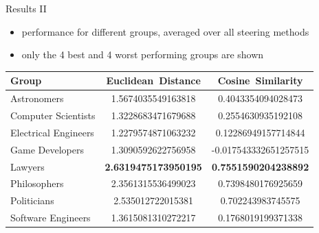 \documentclass[]{beamer}
\begin{document}
\begin{frame}{Results II}
  \begin{itemize}
    \item performance for different groups, averaged over all steering methods
    \item only the 4 best and 4 worst performing groups are shown
  \end{itemize}
  \begin{tabular}{lSS}
    \toprule
    {Group}              & {Euclidean\ Distance}                              & {Cosine\ Similarity}                               \\
    \midrule
    Astronomers          & 1.5674035549163818                                 & 0.4043354094028473                                 \\
    Computer Scientists  & 1.3228683471679688                                 & 0.2554630935192108                                 \\
    Electrical Engineers & 1.2279574871063232                                 & 0.12286949157714844                                \\
    Game Developers      & 1.3090592622756958                                 & -0.017543332651257515                              \\
    Lawyers              &  \bfseries 2.6319475173950195 &  \bfseries 0.7551590204238892 \\
    Philosophers         & 2.3561315536499023                                 & 0.7398480176925659                                 \\
    Politicians          & 2.535012722015381                                  & 0.702243983745575                                  \\
    Software Engineers   & 1.3615081310272217                                 & 0.1768019199371338                                 \\
    \bottomrule
  \end{tabular}
\end{frame}
\end{document}

